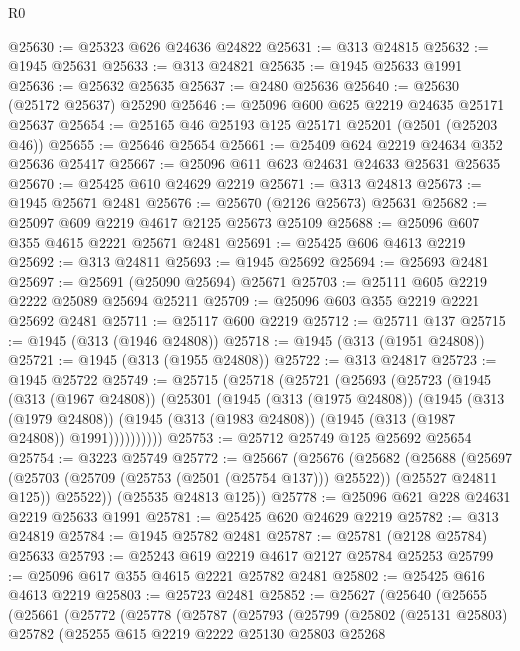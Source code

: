 \begin{lexlean}{R0}
\begin{coremodule}
@25630 := @25323 @626 @24636 @24822
@25631 := @313 @24815
@25632 := @1945 @25631
@25633 := @313 @24821
@25635 := @1945 @25633 @1991
@25636 := @25632 @25635
@25637 := @2480 @25636
@25640 := @25630 (@25172 @25637) @25290
@25646 := @25096 @600 @625 @2219 @24635 @25171 @25637
@25654 := @25165 @46 @25193 @125 @25171 @25201 (@2501 (@25203 @46))
@25655 := @25646 @25654
@25661 := @25409 @624 @2219 @24634 @352 @25636 @25417
@25667 := @25096 @611 @623 @24631 @24633 @25631 @25635
@25670 := @25425 @610 @24629 @2219
@25671 := @313 @24813
@25673 := @1945 @25671 @2481
@25676 := @25670 (@2126 @25673) @25631
@25682 := @25097 @609 @2219 @4617 @2125 @25673 @25109
@25688 := @25096 @607 @355 @4615 @2221 @25671 @2481
@25691 := @25425 @606 @4613 @2219
@25692 := @313 @24811
@25693 := @1945 @25692
@25694 := @25693 @2481
@25697 := @25691 (@25090 @25694) @25671
@25703 := @25111 @605 @2219 @2222 @25089 @25694 @25211
@25709 := @25096 @603 @355 @2219 @2221 @25692 @2481
@25711 := @25117 @600 @2219
@25712 := @25711 @137
@25715 := @1945 (@313 (@1946 @24808))
@25718 := @1945 (@313 (@1951 @24808))
@25721 := @1945 (@313 (@1955 @24808))
@25722 := @313 @24817
@25723 := @1945 @25722
@25749 := @25715
    (@25718
      (@25721
        (@25693
          (@25723
            (@1945
              (@313 (@1967 @24808))
              (@25301
                (@1945
                  (@313 (@1975 @24808))
                  (@1945
                    (@313 (@1979 @24808))
                    (@1945 (@313 (@1983 @24808)) (@1945 (@313 (@1987 @24808)) @1991))))))))))
@25753 := @25712 @25749 @125 @25692 @25654
@25754 := @3223 @25749
@25772 := @25667
    (@25676
      (@25682
        (@25688
          (@25697 (@25703 (@25709 (@25753 (@2501 (@25754 @137))) @25522)) (@25527 @24811 @125))
          @25522))
      (@25535 @24813 @125))
@25778 := @25096 @621 @228 @24631 @2219 @25633 @1991
@25781 := @25425 @620 @24629 @2219
@25782 := @313 @24819
@25784 := @1945 @25782 @2481
@25787 := @25781 (@2128 @25784) @25633
@25793 := @25243 @619 @2219 @4617 @2127 @25784 @25253
@25799 := @25096 @617 @355 @4615 @2221 @25782 @2481
@25802 := @25425 @616 @4613 @2219
@25803 := @25723 @2481
@25852 := @25627
    (@25640
      (@25655
        (@25661
          (@25772
            (@25778
              (@25787
                (@25793
                  (@25799
                    (@25802
                      (@25131 @25803)
                      @25782
                      (@25255
                        @615
                        @2219
                        @2222
                        @25130
                        @25803
                        @25268

\end{coremodule}
\end{lexlean}
